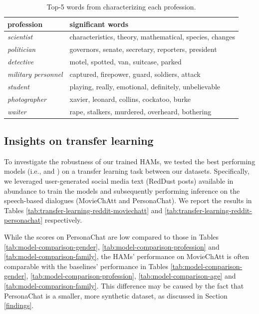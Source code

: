 \begin{table}[t]
\centering
\small
\begin{tabular}{@{}l@{\hskip 0.5\tabcolsep}l@{}}
\toprule
\textbf{profession} & \textbf{significant words} \\
\midrule
\textit{scientist} & characteristics, theory, mathematical, species, changes \\
\textit{politician} & governors, senate, secretary, reporters, president \\
\textit{detective} & motel, spotted, van, suitcase, parked \\
\textit{military personnel} & captured, firepower, guard, soldiers, attack \\
\midrule
\textit{student} & playing, really, emotional, definitely, unbelievable \\
\textit{photographer} & xavier, leonard, collins, cockatoo, burke \\
\textit{waiter} & rape, stalkers, murdered, overheard, bothering \\
\bottomrule
\end{tabular}
\caption{Top-5 words from  characterizing each profession.
}
\label{tab6}
\end{table}

\vspace{-5pt}
\subsection{Insights on transfer learning}

To investigate the robustness of our trained HAMs,
we tested the best performing models (i.e.,  and )
on a transfer learning task between our datasets. 
Specifically, we leveraged user-generated social media text (RedDust posts) available in abundance to train the models and subsequently performing inference on the speech-based dialogues (MovieChAtt and PersonaChat). 
We report the results in Tables \ref{tab:transfer-learning-reddit-moviechatt} and \ref{tab:transfer-learning-reddit-personachat} respectively.

While the scores on PersonaChat are low compared to those in Tables \ref{tab:model-comparison-gender}, \ref{tab:model-comparison-profession} and \ref{tab:model-comparison-family}, the HAMs' performance on MovieChAtt is often comparable with the baselines' performance in Tables \ref{tab:model-comparison-gender}, \ref{tab:model-comparison-profession}, \ref{tab:model-comparison-age} and \ref{tab:model-comparison-family}.
This difference may be caused by the fact that PersonaChat is a smaller, more synthetic dataset, as discussed in Section \ref{findings}.


